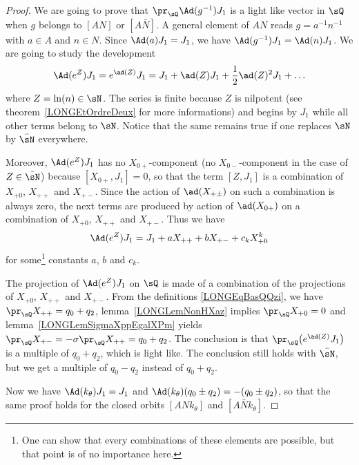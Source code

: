 \begin{proof}
    We are going to prove that $\pr_{\sQ}\Ad(g^{-1})J_1$ is a light like vector in $\sQ$ when $g$ belongs to $[AN]$ or $[A\bar N]$. A general element of $AN$ reads $g=a^{-1}n^{-1}$ with $a\in A$ and $n\in N$. Since $\Ad(a)J_1=J_1$, we have $\Ad(g^{-1})J_1=\Ad(n)J_1$. We are going to study the development
    \begin{equation}
        \Ad( e^{Z})J_1= e^{\ad(Z)}J_1=J_1+\ad(Z)J_1+\frac{ 1 }{2}\ad(Z)^2J_1+\ldots
    \end{equation}
    where $Z=\ln(n)\in\sN$. The series is finite because $Z$ is nilpotent (see theorem~\ref{LONGEtOrdreDeux} for more informations) and begins by $J_1$ while all other terms belong to $\sN$. Notice that the same remains true if one replaces $\sN$ by $\bar \sN$ everywhere.

    Moreover, $\Ad( e^{Z})J_1$ has no $X_{0+}$-component (no $X_{0-}$-component in the case of $Z\in\bar\sN$) because $[X_{0+},J_1]=0$, so that the term $[Z,J_1]$ is a combination of $X_{+0}$, $X_{++}$ and $X_{+-}$.  Since the action of $\ad(X_{+\pm})$ on such a combination is always zero, the next terms are produced by action of $\ad(X_{0+})$ on a combination of $X_{+0}$, $X_{++}$ and $X_{+-}$. Thus we have
\begin{equation}        \label{LONGEqAdanJUnabck}
    \Ad( e^{Z})J_1=J_1+aX_{++}+bX_{+-}+c_kX_{+0}^k
\end{equation}
for some\footnote{One can show that every combinations of these elements are possible, but that point is of no importance here.} constants $a$, $b$ and $c_k$.

The projection of $\Ad( e^{Z})J_1$ on $\sQ$ is made of a combination of the projections of $X_{+0}$, $X_{++}$ and $X_{+-}$. From the definitions \eqref{LONGEqBasQQzi}, we have $\pr_{\sQ}X_{++}=q_0+q_2$, lemma~\ref{LONGLemNonHXaz} implies $\pr_{\sQ}X_{+0}=0$ and lemma~\ref{LONGLemSigmaXppEgalXPm} yields $\pr_{\sQ}X_{+-}=-\sigma\pr_{\sQ}X_{++}=q_0+q_2$. The conclusion is that $\pr_{\sQ}\big( e^{\ad(Z)}J_1\big)$ is a multiple of $q_0+q_2$, which is light like. The conclusion still holds with $\bar\sN$, but we get a multiple of $q_0-q_2$ instead of $q_0+q_2$.

    Now we have $\Ad(k_{\theta})J_1=J_1$ and $\Ad(k_{\theta})(q_0\pm q_2)=-(q_0\pm q_2)$, so that the same proof holds for the closed orbits $[ANk_{\theta}]$ and $[A\bar N k_{\theta}]$.
\end{proof}

